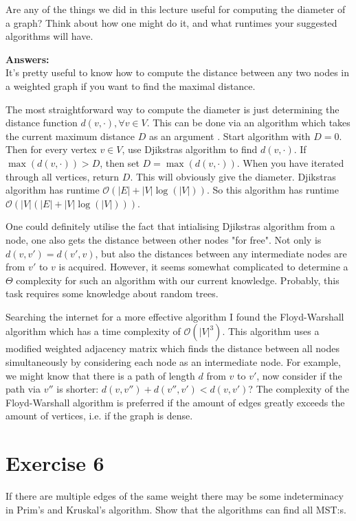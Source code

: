\documentclass[nobib]{tufte-handout}
\begin{document}
Are any of the things we did in this lecture useful for computing the diameter of a graph? Think about how one might do it, and what runtimes your suggested algorithms will have.

\textbf{Answers:}\\

It's pretty useful to know how to compute the distance between any two nodes in a weighted graph if you want to find the maximal distance. 

The most straightforward way to compute the diameter is just determining the distance function  \( d(v, \cdot), \forall v \in V \). This can be done via an algorithm which takes the current maximum distance  \( D \) as an argument . Start algorithm with \( D=0 \). Then for every vertex \( v\in V \), use Djikstras algorithm to find \( d(v,\cdot) \). If \( \max(d(v,\cdot))>D\), then set \(  D=\max(d(v,\cdot)) \). When you have iterated through all vertices, return \( D\). This will obviously give the diameter. Djikstras algorithm has runtime \( \mathcal{O}(|E|+|V| \log(|V|)) \). So this algorithm has runtime \( \mathcal{O}(|V|(|E|+|V| \log(|V|))) \). 

One could definitely utilise the fact that intialising Djikstras algorithm from a node, one also gets the distance between other nodes "for free". Not only is \( d(v,v')=d(v',v) \), but also the distances between any intermediate nodes are from \( v' \) to \( v \) is acquired. However, it seems somewhat complicated to determine a \( \Theta \) complexity for such an algorithm with our current knowledge. Probably, this task requires some knowledge about random trees. 

Searching the internet for a more effective algorithm I found the Floyd-Warshall algorithm which has a time complexity of \( \mathcal{O}(|V|^3) \). This algorithm uses a modified weighted adjacency matrix which finds the distance between all nodes simultaneously by considering each node as an intermediate node. For example, we might know that there is a path of length \( d\) from \( v \) to \( v' \), now consider if the path via \( v''\) is shorter: \( d(v,v'')+d(v'',v')<d(v,v') \)? The complexity of the Floyd-Warshall algorithm is preferred if the amount of edges greatly exceeds the amount of vertices, i.e. if the graph is dense. 

\newpage
\section{Exercise 6}
If there are multiple edges of the same weight there may be some indeterminacy in Prim's and Kruskal's algorithm. Show that the algorithms can find all MST:s. 
\end{document}
